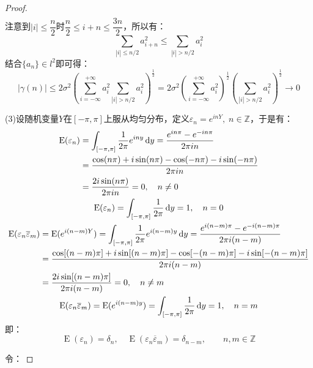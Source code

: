 \begin{proof}
\begin{align*}
	\end{align*}
	注意到$|i|\leqslant\dfrac{n}{2}$时$\dfrac{n}{2}\leqslant i+n\leqslant\dfrac{3n}{2}$，所以有：
	\begin{equation*}
		\sum_{|i|\leqslant n/2}a_{i+n}^2\leqslant\sum_{|i|>n/2}a_{i}^2
	\end{equation*}
	结合$\{a_n\}\in l^2$即可得：
	\begin{equation*}
		|\gamma(n)|\leqslant2\sigma^2\left(\sum_{i=-\infty}^{+\infty}a_i^2\sum_{|i|>n/2}a_{i}^2\right)^\frac{1}{2}=2\sigma^2\left(\sum_{i=-\infty}^{+\infty}a_i^2\right)^{\frac{1}{2}}\left(\sum_{|i|>n/2}^{}a_{i}^2\right)^{\frac{1}{2}}\to0
	\end{equation*}\par
	(3)设随机变量$Y$在$[-\pi,\pi]$上服从均匀分布，定义$\varepsilon_n=e^{inY},\;n\in\mathbb{Z}$，于是有：
	\begin{gather*}
		\begin{aligned}
			\operatorname{E}(\varepsilon_n)&=\int_{[-\pi,\pi]}\frac{1}{2\pi}e^{iny}\mathop{}\!\mathrm{d} y=\frac{e^{in\pi}-e^{-in\pi}}{2\pi in} \\
			&=\frac{\cos(n\pi)+i\sin(n\pi)-\cos(-n\pi)-i\sin(-n\pi)}{2\pi in} \\
			&=\frac{2i\sin(n\pi)}{2\pi in}=0,\quad n\ne0
		\end{aligned} \\
		\operatorname{E}(\varepsilon_n)=\int_{[-\pi,\pi]}\frac{1}{2\pi}\mathop{}\!\mathrm{d} y=1,\quad n=0 \\
		\begin{aligned}
			\operatorname{E}(\varepsilon_n\overline{\varepsilon}_m)&=\operatorname{E}(e^{i(n-m)Y})=\int_{[-\pi,\pi]}\frac{1}{2\pi}e^{i(n-m)y}\mathop{}\!\mathrm{d} y=\frac{e^{i(n-m)\pi}-e^{-i(n-m)\pi}}{2\pi i(n-m)} \\
			&=\frac{\cos[(n-m)\pi]+i\sin[(n-m)\pi]-\cos[-(n-m)\pi]-i\sin[-(n-m)\pi]}{2\pi i(n-m)} \\
			&=\frac{2i\sin[(n-m)\pi]}{2\pi i(n-m)}=0,\quad n\ne m
		\end{aligned} \\
		\operatorname{E}(\varepsilon_n\overline{\varepsilon}_m)=\operatorname{E}(e^{i(n-m)y})=\int_{[-\pi,\pi]}\frac{1}{2\pi}\mathop{}\!\mathrm{d} y=1,\quad n=m
	\end{gather*}
	即：
	\begin{equation*}
		\operatorname{E}(\varepsilon_n)=\delta_n,\quad\operatorname{E}(\varepsilon_n\overline{\varepsilon}_m)=\delta_{n-m},\qquad n,m\in\mathbb{Z}^{}
	\end{equation*}\par
	令：

\end{proof}
